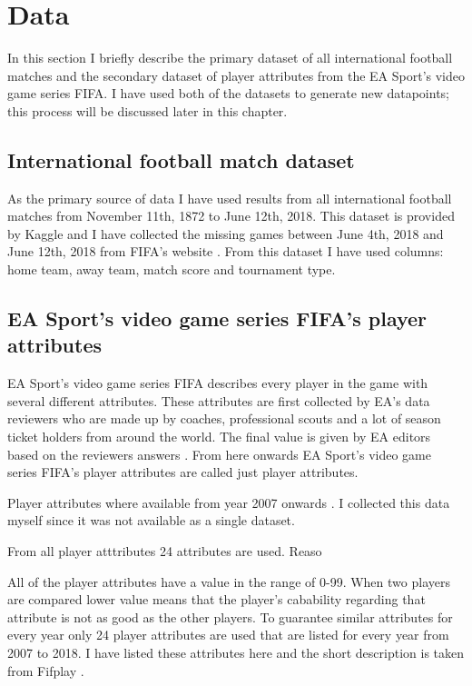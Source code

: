 \section{Data}
In this section I briefly describe the primary dataset of all international football matches and the secondary dataset of player attributes from the EA Sport's video game series FIFA. I have used both of the datasets to generate new datapoints; this process will be discussed later in this chapter.

\subsection{International football match dataset}
As the primary source of data I have used results from all international football matches from November 11th, 1872 to June 12th, 2018. This dataset is provided by Kaggle \cite{matchdb} and I have collected the missing games between June 4th, 2018 and June 12th, 2018 from FIFA's website \cite{fifa:matchdata}. From this dataset I have used columns: home team, away team, match score and tournament type.

\subsection{EA Sport’s video game series FIFA's player attributes}
EA Sport's video game series FIFA describes every player in the game with several different attributes. These attributes are first collected by EA's data reviewers who are made up by coaches, professional scouts and a lot of season ticket holders from around the world. The final value is given by EA editors based on the reviewers answers \cite{playerattr}. From here onwards EA Sport's video game series FIFA's player attributes are called just player attributes.

Player attributes where available from year 2007 onwards \cite{sofifa}. I collected this data myself since it was not available as a single dataset.

From all player atttributes 24 attributes are used. Reaso

All of the player attributes have a value in the range of 0-99. When two players are compared lower value means that the player's cabability regarding that attribute is not as good as the other players. To guarantee similar attributes for every year only 24 player attributes are used that are listed for every year from 2007 to 2018. I have listed these attributes here and the short description is taken from Fifplay \cite{playerattr}.

